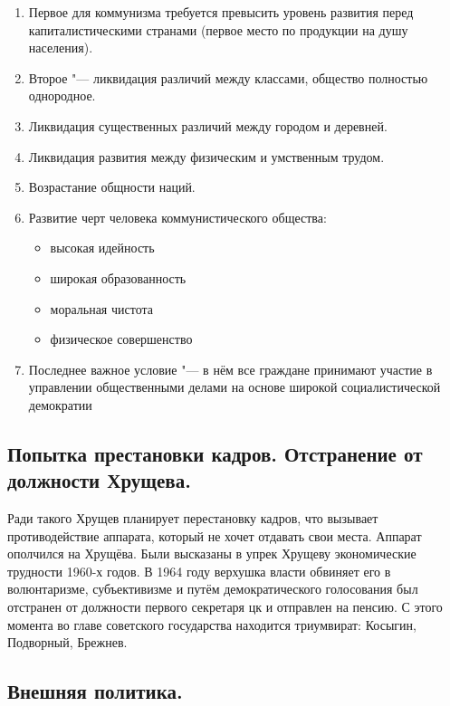 \begin{enumerate}
    \item Первое для коммунизма требуется превысить уровень развития перед капиталистическими странами (первое место по продукции на душу населения).
    \item  Второе "--- ликвидация различий между классами, общество полностью однородное.
    \item Ликвидация существенных различий между городом и деревней.
    \item Ликвидация развития между физическим и умственным трудом.
    \item Возрастание общности наций.
    \item Развитие черт человека коммунистического общества:
        \begin{itemize}
            \item высокая идейность
            \item широкая образованность
            \item моральная чистота
            \item физическое совершенство
        \end{itemize}
    \item Последнее важное условие "--- в нём все граждане принимают участие в управлении общественными делами на основе широкой социалистической демократии

\end{enumerate}

\subsection{Попытка престановки кадров. Отстранение от должности Хрущева.}

Ради такого Хрущев планирует перестановку кадров, что вызывает противодействие аппарата, который не хочет отдавать свои места. Аппарат ополчился на Хрущёва. Были высказаны в упрек Хрущеву экономические трудности 1960-х годов. В 1964 году верхушка власти обвиняет его в волюнтаризме, субъективизме и путём демократического голосования был отстранен от должности первого секретаря цк и отправлен на пенсию. С этого момента во главе советского государства находится триумвират: Косыгин, Подворный, Брежнев.

\subsection{Внешняя политика.}

